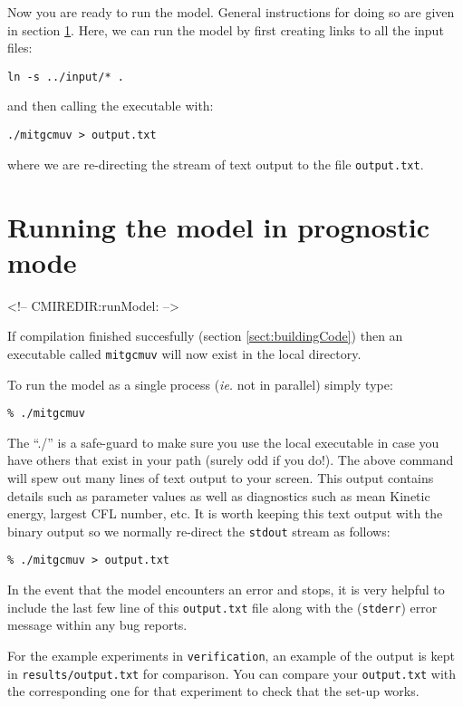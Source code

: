 Now you are ready to run the model. General instructions for doing so are
given in section \ref{sect:runModel}. Here, we can run the model by
first creating links to all the input files:
\begin{verbatim}
ln -s ../input/* .
\end{verbatim}
and then calling the executable with:
\begin{verbatim}
./mitgcmuv > output.txt
\end{verbatim}
where we are re-directing the stream of text output to the file
\texttt{output.txt}.


\section[Running MITgcm]{Running the model in prognostic mode}
\label{sect:runModel}
\begin{rawhtml}
<!-- CMIREDIR:runModel: -->
\end{rawhtml}

If compilation finished succesfully (section \ref{sect:buildingCode})
then an executable called \texttt{mitgcmuv} will now exist in the
local directory.

To run the model as a single process (\textit{ie.} not in parallel)
simply type:
\begin{verbatim}
% ./mitgcmuv
\end{verbatim}
The ``./'' is a safe-guard to make sure you use the local executable
in case you have others that exist in your path (surely odd if you
do!). The above command will spew out many lines of text output to
your screen.  This output contains details such as parameter values as
well as diagnostics such as mean Kinetic energy, largest CFL number,
etc. It is worth keeping this text output with the binary output so we
normally re-direct the \texttt{stdout} stream as follows:
\begin{verbatim}
% ./mitgcmuv > output.txt
\end{verbatim}
In the event that the model encounters an error and stops, it is very
helpful to include the last few line of this \texttt{output.txt} file
along with the (\texttt{stderr}) error message within any bug reports.

For the example experiments in \texttt{verification}, an example of the
output is kept in \texttt{results/output.txt} for comparison. You can
compare your \texttt{output.txt} with the corresponding one for that
experiment to check that the set-up works.



